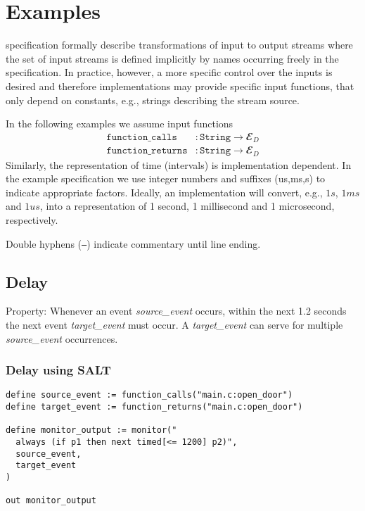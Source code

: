 \section{Examples}

\tessla specification formally describe transformations of input to output streams where the set of input streams is defined implicitly by names occurring freely in the specification. 
In practice, however, a more specific control over the inputs is desired and therefore implementations may provide specific input functions, that only depend on constants, e.g., strings describing the stream source.

In the following examples we assume input functions
\begin{align*}
 \mathtt{function\_calls}&: \mathtt{String} → 𝓔_D\\
 \mathtt{function\_returns}&: \mathtt{String} → 𝓔_D
\end{align*}
Similarly, the representation of time (intervals) is implementation dependent.
In the example specification we use integer numbers and suffixes (us,ms,s) to indicate appropriate factors. 
Ideally, an implementation will convert, e.g.,  $1s$, $1ms$ and $1us$, into a representation of 1 second, 1 millisecond and 1 microsecond, respectively.

Double hyphens (\texttt{--}) indicate commentary until line ending.

\subsection{Delay}

Property: Whenever an event \emph{source\_event} occurs, within the next 1.2 seconds the next event \emph{target\_event} must occur.
A \emph{target\_event} can serve for multiple \emph{source\_event} occurrences.

\subsubsection{Delay using SALT}

\begin{lstlisting}[language=tessla+salt]
define source_event := function_calls("main.c:open_door")
define target_event := function_returns("main.c:open_door")

define monitor_output := monitor("
  always (if p1 then next timed[<= 1200] p2)",
  source_event,
  target_event
)

out monitor_output
\end{lstlisting}

